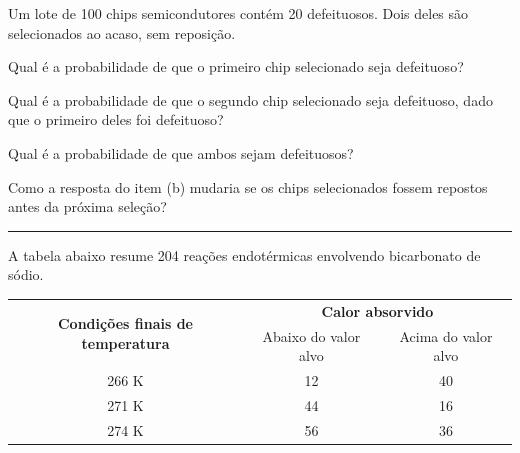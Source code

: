 \documentclass[a4paper,11pt,fleqn]{article}\usepackage[]{graphicx}\usepackage[]{color}
\theoremstyle{definition}
\begin{document}
\begin{compactenum}
\item Um lote de 100 chips semicondutores contém 20 defeituosos. Dois
  deles são selecionados ao acaso, sem reposição.
  \begin{compactenum}
  \item Qual é a probabilidade de que o primeiro chip selecionado seja
    defeituoso?
  \item Qual é a probabilidade de que o segundo chip selecionado seja
    defeituoso, dado que o primeiro deles foi defeituoso?
  \item Qual é a probabilidade de que ambos sejam defeituosos?
  \item Como a resposta do item (b) mudaria se os chips selecionados
    fossem repostos antes da próxima seleção?
  \end{compactenum}

\vspace{0.3cm}
\hrule
\vspace{0.3cm}

\item A tabela abaixo resume 204 reações endotérmicas envolvendo
  bicarbonato de sódio.
  \begin{table}[!h]
    \centering
    \begin{tabular}{ccc}
      \hline
      \multirow{2}{*}{\textbf{Condições finais de temperatura}}
      & \multicolumn{2}{c}{\textbf{Calor absorvido}} \\
      \cline{2-3}
                & Abaixo do valor alvo         & Acima do valor alvo \\
      \hline
      266 K      & 12           & 40           \\
      271 K      & 44           & 16           \\
      274 K      & 56           & 36           \\
      \hline
    \end{tabular}
  \end{table}


\end{compactenum}
\end{document}

